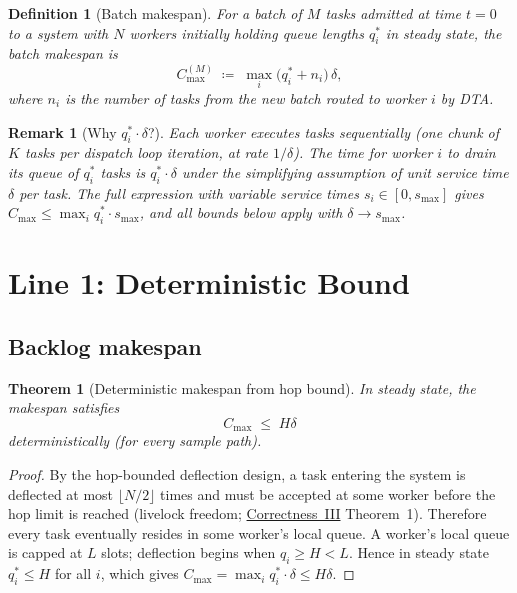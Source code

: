 \documentclass[11pt,a4paper]{article}
\newtheorem{theorem}{Theorem}[section]
\newtheorem{definition}{Definition}[section]
\newtheorem{remark}{Remark}[section]
\newcommand{\Cmax}{C_{\max}}
\begin{document}
\begin{definition}[Batch makespan]
\label{def:batch-makespan}
For a batch of $M$ tasks admitted at time $t=0$ to a system with $N$
workers initially holding queue lengths $q_i^*$ in steady state,
the \emph{batch makespan} is
\[
  \Cmax^{(M)}
  \;\coloneqq\;
  \max_i \bigl(q_i^* + n_i\bigr)\,\delta,
\]
where $n_i$ is the number of tasks from the new batch routed to worker $i$
by DTA.
\end{definition}

\begin{remark}[Why $q_i^* \cdot \delta$?]
Each worker executes tasks sequentially (one chunk of $K$ tasks per
dispatch loop iteration, at rate $1/\delta$).
The time for worker $i$ to drain its queue of $q_i^*$ tasks is
$q_i^* \cdot \delta$ under the simplifying assumption of unit service
time $\delta$ per task.
The full expression with variable service times
$s_i \in [0, s_{\max}]$ gives $\Cmax \leq \max_i q_i^* \cdot s_{\max}$,
and all bounds below apply with $\delta \to s_{\max}$.
\end{remark}

\section{Line 1: Deterministic Bound}

\subsection{Backlog makespan}

\begin{theorem}[Deterministic makespan from hop bound]
\label{thm:det-makespan}
In steady state, the makespan satisfies
\begin{equation}
  \Cmax \;\leq\; H\delta
  \label{eq:det-backlog}
\end{equation}
deterministically (for every sample path).
\end{theorem}

\begin{proof}
By the hop-bounded deflection design, a task entering the system is
deflected at most $\lfloor N/2 \rfloor$ times and must be accepted at
some worker before the hop limit is reached
(livelock freedom; \hyperref[chap:livelock]{Correctness~III} Theorem~1).
Therefore every task eventually resides in some worker's local queue.
A worker's local queue is capped at $L$ slots; deflection begins when
$q_i \geq H < L$.
Hence in steady state $q_i^* \leq H$ for all $i$, which gives
$\Cmax = \max_i q_i^* \cdot \delta \leq H\delta$.
\end{proof}
\end{document}
